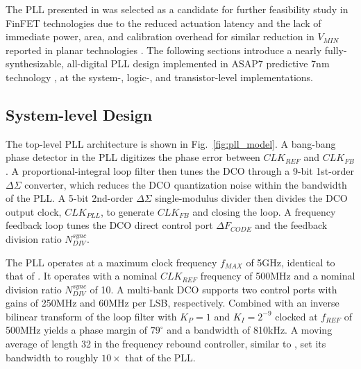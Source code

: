 \documentclass[twoside,9pt,journal,letterpage]{IEEEtran}
\begin{document}
The PLL presented in \cite{hashimoto2018} was selected as a candidate for further feasibility study in FinFET technologies due to the reduced actuation latency and the lack of immediate power, area, and calibration overhead for similar reduction in $V_{MIN}$ reported in planar technologies \cite{hashimoto2018,wilcox2015}. The following sections introduce a nearly fully-synthesizable, all-digital PLL design implemented in ASAP7 predictive 7nm technology \cite{asap7}, at the system-, logic-, and transistor-level implementations.

\vspace{-5pt}
\subsection{System-level Design}
\label{sec:system-level_design}

The top-level PLL architecture is shown in Fig.\ \ref{fig:pll_model}. A bang-bang phase detector in the PLL digitizes the phase error between $CLK_{REF}$ and $CLK_{FB}$. A proportional-integral loop filter then tunes the DCO through a 9-bit 1st-order $\Delta\Sigma$ converter, which reduces the DCO quantization noise within the bandwidth of the PLL. A 5-bit 2nd-order $\Delta\Sigma$ single-modulus divider then divides the DCO output clock, $CLK_{PLL}$, to generate $CLK_{FB}$ and closing the loop. A frequency feedback loop tunes the DCO direct control port $\Delta F_{CODE}$ and the feedback division ratio $N_{DIV}^{sync}$. 

The PLL operates at a maximum clock frequency $f_{MAX}$ of 5GHz, identical to that of \cite{hashimoto2018}. It operates with a nominal  $CLK_{REF}$ frequency of 500MHz and a nominal division ratio $N_{DIV}^{sync}$ of 10. A multi-bank DCO supports two control ports with gains of 250MHz and 60MHz per LSB, respectively. Combined with an inverse bilinear transform of the loop filter with $K_{P}=1$ and $K_{I}=2^{-9}$ clocked at $f_{REF}$ of 500MHz yields a phase margin of $79^{\circ}$ and a bandwidth of 810kHz. A moving average of length 32 in the frequency rebound controller, similar to \cite{hashimoto2018}, set its bandwidth to roughly $10\times$ that of the PLL.
\end{document}
